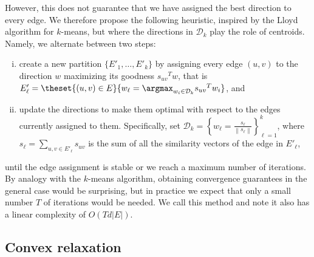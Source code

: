 However,
this does not guarantee that we have assigned the best direction to every edge. We therefore propose
the following heuristic, inspired by the Lloyd algorithm for $k$-means, but where the directions in
$\mathcal{D}_k$ play the role of centroids. Namely, we alternate between two steps:
\begin{enumerate}[(i), nosep]
  \item create a new partition $\{E'_1, \ldots, E'_k\}$ by assigning every edge $(u,v)$ to the
    direction $w$ maximizing its goodness ${s_{uv}}^T w$, that is $E'_\ell = \theset{(u,v) \in E}{
    w_\ell = \argmax_{w_i \in \mathcal{D}_k} {s_{uv}}^T w_i}$, and
  \item update the directions to make them optimal with respect to the edges currently assigned to
    them. Specifically, set $\mathcal{D}_k = \left\{ w_\ell = \frac{s_\ell}{\left\| s_\ell
    \right\|}\right\}_{\ell=1}^k $, where $s_\ell = \sum_{u,v \in E'_\ell} s_{uv}$ is the sum of all
    the similarity vectors of the edge in $E'_\ell$,
\end{enumerate}
until the edge assignment is stable or we reach a maximum number of iterations. By analogy with the
$k$-means algorithm, obtaining convergence guarantees in the general case would be surprising, but in
practice we expect that only a small number $T$ of iterations would be needed. We call this method
\lloyd{} and note it also has a linear complexity of $O(Td|E|)$.

\subsection{Convex relaxation}
\label{sub:edge_vector}

